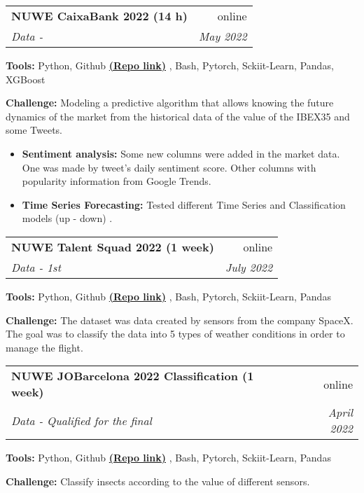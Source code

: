 \documentclass[letterpaper,11pt]{article}
\makeatletter
\newcommand{\resumeSubheading}[4]{
  \vspace{-0.5pt}\item
    \begin{tabular*}{0.97\textwidth}[t]{l@{\extracolsep{\fill}}r}
      \textbf{#1} & #2 \\
      \textit{\small#3} & \textit{\small #4} \\
    \end{tabular*}\vspace{-0.5pt}
}
\makeatother
\begin{document}
{      \resumeSubheading
        {NUWE CaixaBank 2022 (14 h)}{online}
        {Data - }{May 2022}
        \textbf{Tools:} Python, Github \href{https://github.com/puchee99/CaixaBank_DS}{\textbf{(Repo link)}} , Bash, Pytorch, Sckiit-Learn, Pandas, XGBoost

        \textbf{Challenge:}{ Modeling a predictive algorithm that allows knowing the future dynamics of the market from the historical data of the value of the IBEX35 and some Tweets.}
  
        \begin{itemize}
          \item{\textbf{Sentiment analysis:} Some new columns were added in the market data. One was made by tweet's daily sentiment score. Other columns with popularity information from Google Trends.}      
        \end{itemize}
        \begin{itemize}
        \item{\textbf{Time Series Forecasting:} Tested different Time Series and Classification models (up - down) .
        }      
        \end{itemize}
      \resumeSubheading
        {NUWE Talent Squad 2022 (1 week)}{online}
        {Data - 1st}{July 2022}
        \textbf{Tools:} Python, Github \href{https://github.com/puchee99/TalentSquad22}{\textbf{(Repo link)}} , Bash, Pytorch, Sckiit-Learn, Pandas
        
        \textbf{Challenge:}{ The dataset was data created by sensors from the company SpaceX. The goal was to classify the data into 5 types of weather conditions in order to manage the flight.}
        \begin{itemize}
        \item{\textbf{Multivariant Classification:} Neural networks were used.
      \end{itemize}

      \resumeSubheading
        {NUWE JOBarcelona 2022 Classification (1 week)}{online}
        {Data - Qualified for the final}{April 2022}
        \textbf{Tools:} Python, Github \href{https://github.com/puchee99/JOBcn-DS-2022}{\textbf{(Repo link)}} , Bash, Pytorch, Sckiit-Learn, Pandas
        
        \textbf{Challenge:}{ Classify insects according to the value of different sensors.}
        \begin{itemize}
        \item{\textbf{Multivariant Classification:} Neural networks were used.
      \end{itemize}
        
}
\end{document}
